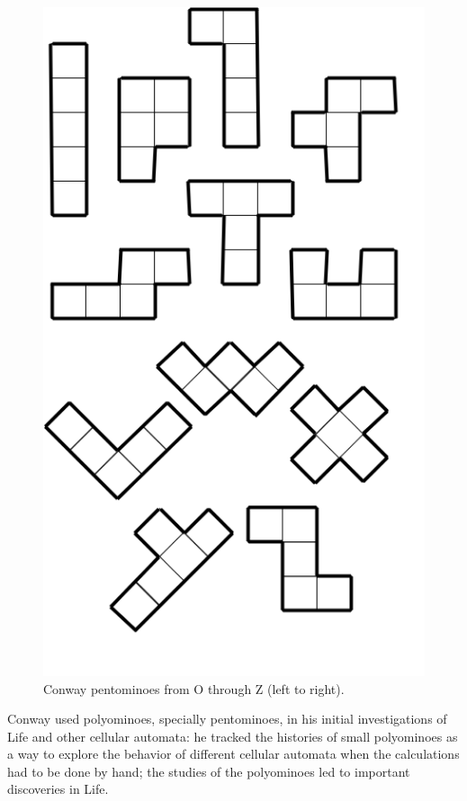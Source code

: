 \begin{figure}[H]
	\centering
	\includegraphics[scale=0.25]{diagrams/conway_pentominoes.PNG}
	\caption{Conway pentominoes from O through Z (left to right).}
  \label{fig:conway_pentominoes}
\end{figure}

Conway used polyominoes, specially pentominoes, in his initial investigations of
Life and other cellular automata: he tracked the histories of small polyominoes
as a way to explore the behavior of different cellular automata when the
calculations had to be done by hand; the studies of the polyominoes led to
important discoveries in Life.


